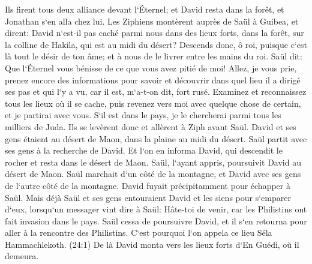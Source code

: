 \verse Ils firent tous deux alliance devant l`Éternel; et David resta dans la forêt, et Jonathan s`en alla chez lui. 
\verse Les Ziphiens montèrent auprès de Saül à Guibea, et dirent: David n`est-il pas caché parmi nous dans des lieux forts, dans la forêt, sur la colline de Hakila, qui est au midi du désert? 
\verse Descends donc, ô roi, puisque c`est là tout le désir de ton âme; et à nous de le livrer entre les mains du roi. 
\verse Saül dit: Que l`Éternel vous bénisse de ce que vous avez pitié de moi! 
\verse Allez, je vous prie, prenez encore des informations pour savoir et découvrir dans quel lieu il a dirigé ses pas et qui l`y a vu, car il est, m`a-t-on dit, fort rusé. 
\verse Examinez et reconnaissez tous les lieux où il se cache, puis revenez vers moi avec quelque chose de certain, et je partirai avec vous. S`il est dans le pays, je le chercherai parmi tous les milliers de Juda. 
\verse Ils se levèrent donc et allèrent à Ziph avant Saül. David et ses gens étaient au désert de Maon, dans la plaine au midi du désert. 
\verse Saül partit avec ses gens à la recherche de David. Et l`on en informa David, qui descendit le rocher et resta dans le désert de Maon. Saül, l`ayant appris, poursuivit David au désert de Maon. 
\verse Saül marchait d`un côté de la montagne, et David avec ses gens de l`autre côté de la montagne. David fuyait précipitamment pour échapper à Saül. Mais déjà Saül et ses gens entouraient David et les siens pour s`emparer d`eux, 
\verse lorsqu`un messager vint dire à Saül: Hâte-toi de venir, car les Philistins ont fait invasion dans le pays. 
\verse Saül cessa de poursuivre David, et il s`en retourna pour aller à la rencontre des Philistins. C`est pourquoi l`on appela ce lieu Séla Hammachlekoth. 
\verse (24:1) De là David monta vers les lieux forts d`En Guédi, où il demeura. 

